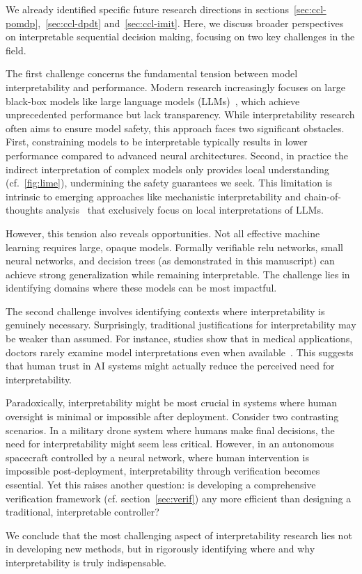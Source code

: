 We already identified specific future research directions in sections~\ref{sec:ccl-pomdp},~\ref{sec:ccl-dpdt} and~\ref{sec:ccl-imit}. Here, we discuss broader perspectives on interpretable sequential decision making, focusing on two key challenges in the field.

The first challenge concerns the fundamental tension between model interpretability and performance. Modern research increasingly focuses on large black-box models like large language models (LLMs)~\cite{all-you-need}, which achieve unprecedented performance but lack transparency. While interpretability research often aims to ensure model safety, this approach faces two significant obstacles. First, constraining models to be interpretable typically results in lower performance compared to advanced neural architectures. Second, in practice the indirect interpretation of complex models only provides local understanding (cf.~\ref{fig:lime}), undermining the safety guarantees we seek. This limitation is intrinsic to emerging approaches like mechanistic interpretability and chain-of-thoughts analysis~\cite{barez-chain-2025} that exclusively focus on local interpretations of LLMs.

However, this tension also reveals opportunities. Not all effective machine learning requires large, opaque models. Formally verifiable relu networks, small neural networks, and decision trees (as demonstrated in this manuscript) can achieve strong generalization while remaining interpretable. The challenge lies in identifying domains where these models can be most impactful.

The second challenge involves identifying contexts where interpretability is genuinely necessary. Surprisingly, traditional justifications for interpretability may be weaker than assumed. For instance, studies show that in medical applications, doctors rarely examine model interpretations even when available~\cite{festor}. This suggests that human trust in AI systems might actually reduce the perceived need for interpretability.

Paradoxically, interpretability might be most crucial in systems where human oversight is minimal or impossible after deployment. Consider two contrasting scenarios. In a military drone system where humans make final decisions, the need for interpretability might seem less critical. However, in an autonomous spacecraft controlled by a neural network, where human intervention is impossible post-deployment, interpretability through verification becomes essential. Yet this raises another question: is developing a comprehensive verification framework (cf. section~\ref{sec:verif}) any more efficient than designing a traditional, interpretable controller?

We conclude that the most challenging aspect of interpretability research lies not in developing new methods, but in rigorously identifying where and why interpretability is truly indispensable.

